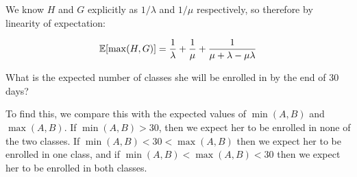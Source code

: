 \documentclass[11pt]{article}
\begin{document}
\begin{ResumeParts}
\begin{solution}
		We know $H$ and $G$ explicitly as $1/\lambda$ and $1/\mu$ respectively, so therefore by linearity of expectation: 

		\[ \operatorname{\mathbb{E}}[\max(H, G)] = \frac{1}{\lambda} + \frac{1}{\mu} + \frac{1}{\mu + \lambda - \mu \lambda}\]
	\end{solution}
	

	\Part What is the expected number of classes she will be enrolled in by the end of 30 days?
	
	\begin{solution}
		To find this, we compare this with the expected values of $\min(A, B)$ and $\max(A, B)$. If $\min(A, B) > 30$, then we expect her to be enrolled in none of the two classes. If $\min(A, B) < 30 < \max(A, B)$ then we expect her to be enrolled in one class, and if $\min(A, B) < \max(A, B) < 30$ then we expect her to be enrolled in both classes.
	\end{solution}
	

\end{ResumeParts}

\pagebreak
{}
\end{document}
